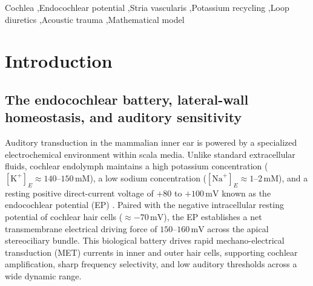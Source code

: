 \documentclass[final,5p,times]{elsarticle}
\begin{document}
\begin{frontmatter}
\begin{keyword}
Cochlea \sep Endocochlear potential \sep Stria vascularis \sep Potassium recycling \sep Loop diuretics \sep Acoustic trauma \sep Mathematical model
\end{keyword}

\end{frontmatter}

\section{Introduction}\label{sec:introduction}

\subsection{The endocochlear battery, lateral-wall homeostasis, and auditory sensitivity}\label{sec:intro-battery}

Auditory transduction in the mammalian inner ear is powered by a specialized electrochemical environment within scala media. Unlike standard extracellular fluids, cochlear endolymph maintains a high potassium concentration (\([\mathrm{K}^+]_E \approx 140\text{--}150\,\mathrm{mM}\)), a low sodium concentration (\([\mathrm{Na}^+]_E \approx 1\text{--}2\,\mathrm{mM}\)), and a resting positive direct-current voltage of \(+80\) to \(+100\,\mathrm{mV}\) known as the endocochlear potential (EP) \citep{Davis1958,Wangemann2002}. Paired with the negative intracellular resting potential of cochlear hair cells (\(\approx -70\,\mathrm{mV}\)), the EP establishes a net transmembrane electrical driving force of \(150\text{--}160\,\mathrm{mV}\) across the apical stereociliary bundle. This biological battery drives rapid mechano-electrical transduction (MET) currents in inner and outer hair cells, supporting cochlear amplification, sharp frequency selectivity, and low auditory thresholds across a wide dynamic range.
\end{document}
